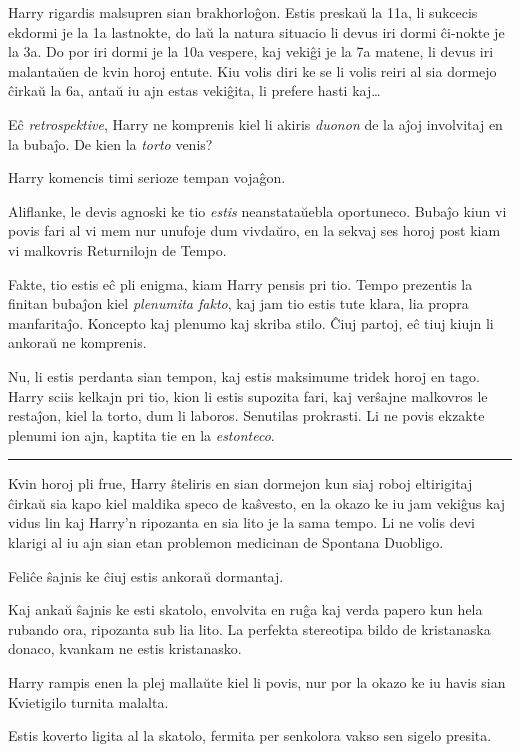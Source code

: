 Harry rigardis malsupren sian brakhorloĝon. Estis preskaŭ la 11a, li
sukcecis ekdormi je la 1a lastnokte, do laŭ la natura situacio li
devus iri dormi ĉi-nokte je la 3a. Do por iri dormi je la 10a vespere,
kaj vekiĝi je la 7a matene, li devus iri malantaŭen de kvin horoj
entute. Kiu volis diri ke se li volis reiri al sia dormejo ĉirkaŭ la 6a,
antaŭ iu ajn estas vekiĝita, li prefere hasti kaj\ldots  

Eĉ \emph{retrospektive}, Harry ne komprenis kiel li akiris
\emph{duonon} de la aĵoj involvitaj en la bubaĵo. De kien la
\emph{torto} venis?

Harry komencis timi serioze tempan vojaĝon.

Aliflanke, le devis agnoski ke tio \emph{estis} neanstataŭebla
oportuneco. Bubaĵo kiun vi povis fari al vi mem nur unufoje dum
vivdaŭro, en la sekvaj ses horoj post kiam vi malkovris Returnilojn de
Tempo.

Fakte, tio estis eĉ pli enigma, kiam Harry pensis pri tio. Tempo
prezentis la finitan bubaĵon kiel \emph{plenumita fakto}, kaj jam tio
estis tute klara, lia propra manfaritaĵo. Koncepto kaj plenumo kaj
skriba stilo. Ĉiuj partoj, eĉ tiuj kiujn li ankoraŭ ne komprenis.

Nu, li estis perdanta sian tempon, kaj estis maksimume tridek horoj en
tago. Harry sciis kelkajn pri tio, kion li estis supozita fari, kaj
verŝajne malkovros le restaĵon, kiel la torto, dum li
laboros. Senutilas prokrasti. Li ne povis ekzakte plenumi ion ajn,
kaptita tie en la \emph{estonteco}.

\begin{center}\rule{3in}{0.4pt}\end{center}

Kvin horoj pli frue, Harry ŝteliris en sian dormejon kun siaj roboj
eltirigitaj ĉirkaŭ sia kapo kiel maldika speco de kaŝvesto, en la
okazo ke iu jam vekiĝus kaj vidus lin kaj Harry'n ripozanta en sia
lito je la sama tempo. Li ne volis devi klarigi al iu ajn sian
etan problemon medicinan de Spontana Duobligo.

Feliĉe ŝajnis ke ĉiuj estis ankoraŭ dormantaj.

Kaj ankaŭ ŝajnis ke esti skatolo, envolvita en ruĝa kaj verda papero
kun hela rubando ora, ripozanta sub lia lito. La perfekta stereotipa
bildo de kristanaska donaco, kvankam ne estis kristanasko.

Harry rampis enen la plej mallaŭte kiel li povis, nur por la okazo ke
iu havis sian Kvietigilo turnita malalta.

Estis koverto ligita al la skatolo, fermita per senkolora vakso sen
sigelo presita.

